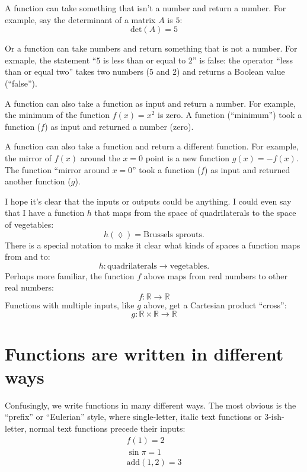 A function can take something that isn't a number and return a number. For
example, say the determinant of a matrix $A$ is $5$:
\begin{equation*}
\mathrm{det}(A) = 5
\end{equation*}

Or a function can take numbers and return something that is not a number. For
exmaple, the statement ``$5$ is less than or equal to $2$'' is false: the
operator ``less than or equal two'' takes two numbers ($5$ and $2$) and returns
a Boolean value (``false'').

A function can also take a function as input and return a number. For example,
the minimum of the function $f(x) = x^2$ is zero. A function (``minimum'') took
a function ($f$) as input and returned a number (zero).

A function can also take a function and return a different function. For
example, the mirror of $f(x)$ around the $x=0$ point is a new function $g(x) =
-f(x)$. The function ``mirror around $x=0$'' took a function ($f$) as input and
returned another function ($g$).

I hope it's clear that the inputs or outputs could be anything. I could even
say that I have a function $h$ that maps from the space of quadrilaterals to
the space of vegetables:
\begin{equation*}
h(\lozenge) = \text{Brussels sprouts}.
\end{equation*}
There is a special notation to make it clear what kinds of spaces a function
maps from and to:
\begin{equation*}
h : \text{quadrilaterals} \to \text{vegetables}.
\end{equation*}
Perhaps more familiar, the function $f$ above maps from real numbers to other
real numbers:
\begin{equation*}
f : \mathbb{R} \to \mathbb{R}
\end{equation*}
Functions with multiple inputs, like $g$ above, get a Cartesian product
``cross'':
\begin{equation*}
g : \mathbb{R} \times \mathbb{R} \to \mathbb{R}
\end{equation*}



\section{Functions are written in different ways}

Confusingly, we write functions in many different ways. The most obvious is the
``prefix'' or ``Eulerian'' style, where single-letter, italic text functions or
3-ish-letter, normal text functions precede their inputs:
\begin{gather*}
f(1) = 2 \\
\sin \pi = 1 \\
\mathrm{add}(1, 2) = 3
\end{gather*}

